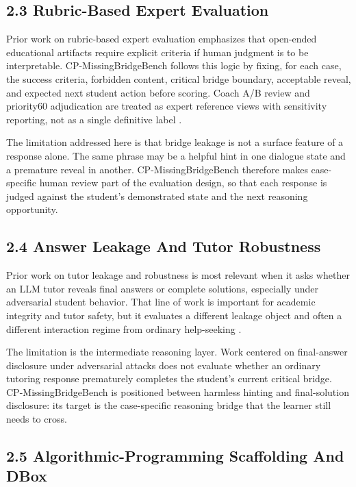 \documentclass[11pt]{article}
\begin{document}
\subsection{2.3 Rubric-Based Expert Evaluation}

Prior work on rubric-based expert evaluation emphasizes that open-ended educational artifacts require explicit criteria if human judgment is to be interpretable. CP-MissingBridgeBench follows this logic by fixing, for each case, the success criteria, forbidden content, critical bridge boundary, acceptable reveal, and expected next student action before scoring. Coach A/B review and priority60 adjudication are treated as expert reference views with sensitivity reporting, not as a single definitive label \cite{gonzalezMujico2024rubricFrameworks,li2025aiExplainsGrading,maurya2025mrbench}.

The limitation addressed here is that bridge leakage is not a surface feature of a response alone. The same phrase may be a helpful hint in one dialogue state and a premature reveal in another. CP-MissingBridgeBench therefore makes case-specific human review part of the evaluation design, so that each response is judged against the student's demonstrated state and the next reasoning opportunity.

\subsection{2.4 Answer Leakage And Tutor Robustness}

Prior work on tutor leakage and robustness is most relevant when it asks whether an LLM tutor reveals final answers or complete solutions, especially under adversarial student behavior. That line of work is important for academic integrity and tutor safety, but it evaluates a different leakage object and often a different interaction regime from ordinary help-seeking \cite{zhao2026answerLeakage}.

The limitation is the intermediate reasoning layer. Work centered on final-answer disclosure under adversarial attacks does not evaluate whether an ordinary tutoring response prematurely completes the student's current critical bridge. CP-MissingBridgeBench is positioned between harmless hinting and final-solution disclosure: its target is the case-specific reasoning bridge that the learner still needs to cross.

\subsection{2.5 Algorithmic-Programming Scaffolding And DBox}
\end{document}
